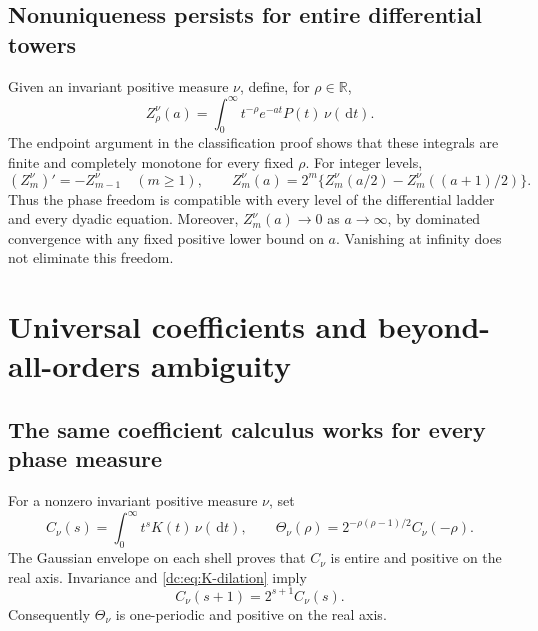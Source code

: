 \documentclass[11pt,a4paper,oneside,openany]{book}
\numberwithin{equation}{chapter}
\theoremstyle{definition}
\theoremstyle{remark}
\newcommand{\R}{\mathbb R}
\newcommand{\dd}{\,\mathrm d}
\newcommand{\W}{K}
\begin{document}
\section{Nonuniqueness persists for entire differential towers}
Given an invariant positive measure $\nu$, define, for $\rho\in\R$,
\begin{equation}\label{ra:eq:generalizedC}
 Z_\rho^\nu(a)=\int_0^\infty t^{-\rho}e^{-at}P(t)\,\nu(\dd t).
\end{equation}
The endpoint argument in the classification proof shows that these
integrals are finite and completely monotone for every fixed $\rho$.
For integer levels,
\begin{equation}\label{ra:eq:nutowerlaws}
 (Z_m^\nu)'=-Z_{m-1}^\nu\quad(m\ge1),\qquad
 Z_m^\nu(a)=2^m\{Z_m^\nu(a/2)-Z_m^\nu((a+1)/2)\}.
\end{equation}
Thus the phase freedom is compatible with every level of the differential
ladder and every dyadic equation. Moreover, $Z_m^\nu(a)\to0$ as
$a\to\infty$, by dominated convergence with any fixed positive lower
bound on $a$. Vanishing at infinity does not eliminate this freedom.
\chapter{Universal coefficients and beyond-all-orders ambiguity}\label{ra:sec:ambiguity}

\section{The same coefficient calculus works for every phase measure}
For a nonzero invariant positive measure $\nu$, set
\begin{equation}\label{ra:eq:Knu}
 C_\nu(s)=\int_0^\infty t^s\W(t)\,\nu(\dd t),\qquad
 \Theta_\nu(\rho)=2^{-\rho(\rho-1)/2}C_\nu(-\rho).
\end{equation}
The Gaussian envelope on each shell proves that $C_\nu$ is entire and
positive on the real axis. Invariance and \eqref{dc:eq:K-dilation} imply
\begin{equation}\label{ra:eq:Knurecurrence}
 C_\nu(s+1)=2^{s+1}C_\nu(s).
\end{equation}
Consequently $\Theta_\nu$ is one-periodic and positive on the real axis.
\end{document}
